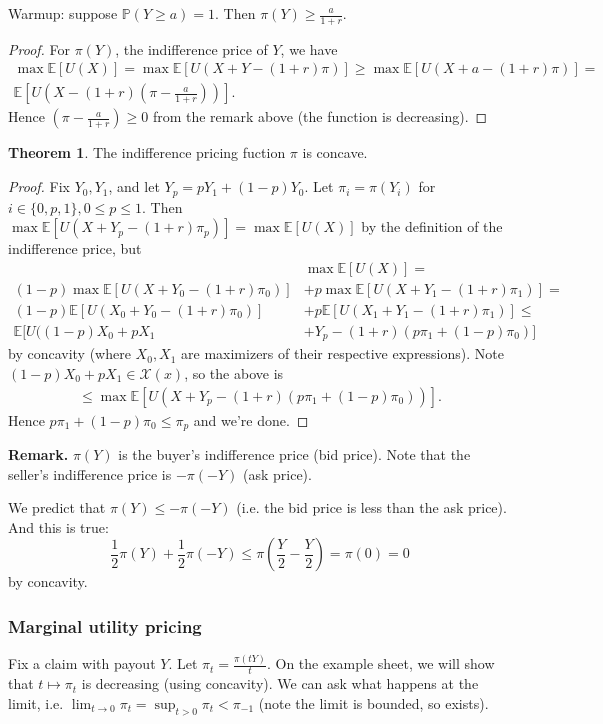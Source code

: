 \documentclass{article}
\theoremstyle{definition}
\newtheorem{theorem}{Theorem}[section]
\begin{document}
Warmup: suppose $\mathbb{P}(Y \ge a) = 1$. Then $\pi(Y)\ge \frac{a}{1+r}$. 
\begin{proof}
    For $\pi(Y)$, the indifference price of $Y$, we have
    \begin{align*}
        \max \mathbb{E}[U(X)] =\max \mathbb{E}[U(X+Y-(1+r)\pi)] \ge \max \mathbb{E}[U(X+a-(1+r)\pi)] = \\ \mathbb{E}[U(X-(1+r)(\pi-\frac{a}{1+r}))].
    \end{align*}
    Hence $(\pi-\frac{a}{1+r})\ge 0$ from the remark above (the function is decreasing).
\end{proof}
\begin{theorem}
    The indifference pricing fuction $\pi$ is concave.
\end{theorem}
\begin{proof}
    Fix $Y_0, Y_1$, and let $Y_p = pY_1 + (1-p)Y_0$. Let $\pi_i = \pi(Y_i)$ for $i \in \{0,p,1\}, 0\le p\le 1$. Then $\max \mathbb{E}[U(X+Y_p - (1+r)\pi_p)] = \max \mathbb{E}[U(X)]$ by the definition of the indifference price, but 
    \begin{align*}
        &\max \mathbb{E}[U(X)] = \\ 
        (1-p) \max \mathbb{E}[U(X+Y_0 - (1+r)\pi_0)] &+ p \max \mathbb{E}[U(X+Y_1 -(1+r)\pi_1)] = \\
        (1-p)\mathbb{E}[U(X_0+Y_0-(1+r)\pi_0)] &+ p \mathbb{E}[U(X_1 + Y_1 - (1+r)\pi_1)] \le \\
        \mathbb{E}[U((1-p)X_0+pX_1 &+ Y_p -(1+r)(p \pi_1 + (1-p)\pi_0)]
    \end{align*}
    by concavity (where $X_0,X_1$ are maximizers of their respective expressions). Note $(1-p)X_0 + pX_1 \in \mathcal{X}(x)$, so the above is 
    \begin{align*}
        \le \max \mathbb{E}[U(X+Y_p -(1+r)(p \pi_1 +(1-p)\pi_0))].
    \end{align*}
    Hence $p \pi_1 + (1-p)\pi_0 \le \pi_p$ and we're done.
\end{proof}
\textbf{Remark.} $\pi(Y)$ is the buyer's indifference price (bid price). Note that the seller's indifference price is $-\pi(-Y)$ (ask price).
\vspace{1mm}

We predict that $\pi(Y) \le -\pi(-Y)$ (i.e. the bid price is less than the ask price). And this is true: \[
\frac{1}{2}\pi(Y) + \frac{1}{2}\pi(-Y) \le \pi\left(\frac{Y}{2}-\frac{Y}{2}\right) = \pi(0) = 0
\] by concavity.

\subsubsection{Marginal utility pricing}
Fix a claim with payout $Y$. Let $\pi_t = \frac{\pi(tY)}{t}$. On the example sheet, we will show that $t \mapsto \pi_t$ is decreasing (using concavity). We can ask what happens at the limit, i.e. $\lim_{t \to 0}\pi_t = \sup_{t>0}\pi_t < \pi_{-1}$ (note the limit is bounded, so exists).
\end{document}
